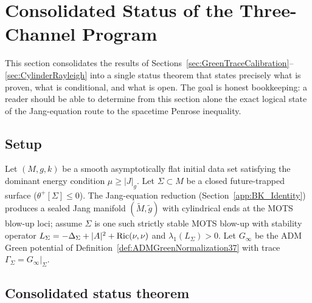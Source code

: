 \section{Consolidated Status of the Three-Channel Program}
\label{sec:ConsolidatedStatus}

This section consolidates the results of Sections~\ref{sec:GreenTraceCalibration}--\ref{sec:CylinderRayleigh} into a single status theorem that states precisely what is proven, what is conditional, and what is open. The goal is honest bookkeeping: a reader should be able to determine from this section alone the exact logical state of the Jang-equation route to the spacetime Penrose inequality.

\subsection{Setup}

Let $(M,g,k)$ be a smooth asymptotically flat initial data set satisfying the dominant energy condition $\mu\ge|J|_g$. Let $\Sigma\subset M$ be a closed future-trapped surface ($\theta^+[\Sigma]\le0$). The Jang-equation reduction (Section~\ref{app:BK_Identity}) produces a sealed Jang manifold $(\widetilde M,\widetilde g)$ with cylindrical ends at the MOTS blow-up loci; assume $\Sigma$ is one such strictly stable MOTS blow-up with stability operator $L_\Sigma=-\Delta_\Sigma+|A|^2+\mathrm{Ric}(\nu,\nu)$ and $\lambda_1(L_\Sigma)>0$. Let $G_\infty$ be the ADM Green potential of Definition~\ref{def:ADMGreenNormalization37} with trace $\Gamma_\Sigma=G_\infty|_\Sigma$.

\subsection{Consolidated status theorem}

